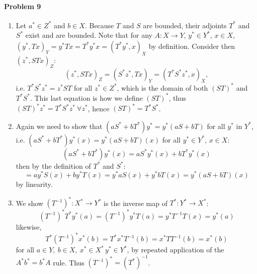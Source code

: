 \documentclass[12pt]{article}
\begin{document}
\paragraph{Problem 9}
\begin{enumerate}[label=(\alph*)]
\item 
  Let $a^*\in Z^*$ and $b\in X$. Because $T$ and $S$ are bounded, their adjoints
  $T^*$ and $S^*$ exist and are bounded. Note that for any $A: X\to Y$, $y^*\in
  Y^*$, $x\in X$, $(y^*, Tx)_Y = y^*Tx = T^*y^*x = (T^*y^*,x)_X$ by definition.
  Consider then $(z^*,STx)_Z$:
  \begin{displaymath}
    (z^*,STx)_Z = (S^*z^*,Tx)_Y = (T^*S^*z^*,x)_X,
  \end{displaymath}
  i.e. $T^*S^*z^* = z^*ST$ for all $z^* \in Z^*$, which is the domain of both
  $(ST)^*$ and $T^*S^*$. This last equation is how we define $(ST)^*$, thus $(ST)^*
  z^* = T^*S^*z^*\ \forall z^*$, hence $(ST)^* = T^*S^*$.
\item Again we need to show that $(aS^* + bT^*)y^* = y^*(aS+bT)$ for all $y^*
  $ in $Y^*$, i.e. $(aS^*+bT^*)y^*(x) = y^*(aS+bT)(x)$ for all $y^*\in Y^*$,
  $x\in X$:
  \begin{displaymath}
    (aS^*+bT^*)y^*(x) = aS^*y^*(x)+bT^*y^*(x)
  \end{displaymath}
  then by the definition of $T^*$ and $S^*$:
  \begin{displaymath}
    = ay^*S(x)+by^*T(x) = y^*aS(x)+y^*bT(x) = y^*(aS + bT)(x)
  \end{displaymath}
  by linearity.
\item We show $(T^{-1})^*: X^*\to Y^*$ is the inverse map of $T^*:Y^*\to X^*$:
  \begin{displaymath}
    (T^{-1})^*T^*y^*(a) = (T^{-1})^*y^*T(a) = y^*T^{-1}T(x) = y^*(a)
  \end{displaymath}
  likewise,
  \begin{displaymath}
    T^*(T^{-1})^*x^*(b) = T^*x^*T^{-1}(b) = x^*TT^{-1}(b) = x^*(b)
  \end{displaymath}
  for all $a\in Y,\ b\in X,\ x^*\in X^*\, y^*\in Y^*$, by repeated application
  of the $A^*b^* = b^*A$ rule. Thus $(T^{-1})^* = (T^*)^{-1}$.

\end{enumerate}
\end{document}
